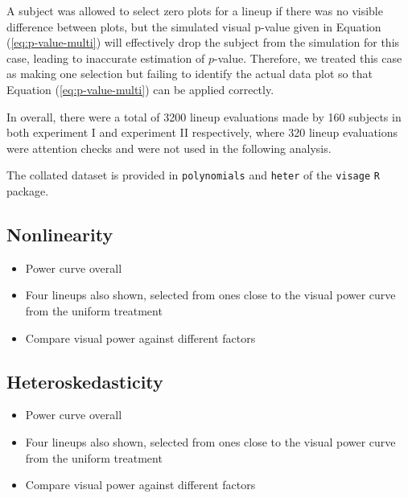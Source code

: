 \documentclass[]{interact}
\theoremstyle{plain}%
\theoremstyle{definition}
\theoremstyle{remark}
\providecommand{\tightlist}{%
  \setlength{\itemsep}{0pt}\setlength{\parskip}{0pt}}
\def\tightlist{}
\begin{document}
A subject was allowed to select zero plots for a lineup if there was no
visible difference between plots, but the simulated visual p-value given
in Equation (\ref{eq:p-value-multi}) will effectively drop the subject
from the simulation for this case, leading to inaccurate estimation of
\(p\)-value. Therefore, we treated this case as making one selection but
failing to identify the actual data plot so that Equation
(\ref{eq:p-value-multi}) can be applied correctly.

In overall, there were a total of 3200 lineup evaluations made by 160
subjects in both experiment I and experiment II respectively, where 320
lineup evaluations were attention checks and were not used in the
following analysis.

The collated dataset is provided in \texttt{polynomials} and
\texttt{heter} of the \texttt{visage} \texttt{R} package.

\hypertarget{section}{%
\subsection{}\label{section}}

\hypertarget{nonlinearity-1}{%
\subsection{Nonlinearity}\label{nonlinearity-1}}

\begin{itemize}
\tightlist
\item
  Power curve overall
\item
  Four lineups also shown, selected from ones close to the visual power
  curve from the uniform treatment
\item
  Compare visual power against different factors
\end{itemize}

\hypertarget{heteroskedasticity-2}{%
\subsection{Heteroskedasticity}\label{heteroskedasticity-2}}

\begin{itemize}
\tightlist
\item
  Power curve overall
\item
  Four lineups also shown, selected from ones close to the visual power
  curve from the uniform treatment
\item
  Compare visual power against different factors
\end{itemize}
\end{document}
